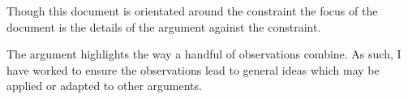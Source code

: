 \begin{note}
  Though this document is orientated around the constraint the focus of the document is the details of the argument against the constraint.

  The argument highlights the way a handful of observations combine.
  As such, I have worked to ensure the observations lead to general ideas which may be applied or adapted to other arguments.
\end{note}



